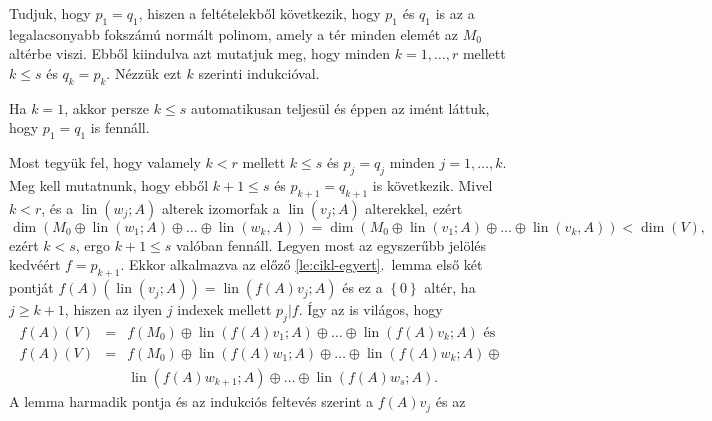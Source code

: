 \documentclass[a4paper, showtrims]{memoir}
\makeatletter
\renewenvironment{proof}[1][\proofname]
    {\par\pushQED{\qed}%
    \normalfont \topsep6\p@\@plus6\p@\relax
    \trivlist
    \item[\hskip\labelsep
        \itshape
    #1\@addpunct{:}]\ignorespaces}
    {\popQED\endtrivlist\@endpefalse}
\theoremstyle{plain}
\theoremstyle{remark}
\theoremstyle{definition}
\DeclareMathOperator{\lin}{lin}
\makeatother
\begin{document}
\begin{proof}
    Tudjuk, hogy $p_1=q_1$, hiszen a feltételekből következik, hogy $p_1$ és $q_1$ is az a legalacsonyabb fokszámú normált polinom, amely a tér minden elemét az $M_0$ altérbe viszi.
    Ebből kiindulva azt mutatjuk meg, 
    hogy minden $k=1,\ldots,r$ mellett $k\leq s$ és $q_k=p_k$.
    Nézzük ezt $k$ szerinti indukcióval.

    Ha $k=1$, akkor persze $k\leq s$ automatikusan teljesül és éppen az imént láttuk, hogy $p_1=q_1$ is fennáll.

    Most tegyük fel, hogy valamely $k<r$ mellett $k\leq s$ és $p_j=q_j$ minden $j=1,\ldots,k$.
    Meg kell mutatnunk, hogy ebből $k+1\leq s$ és $p_{k+1}=q_{k+1}$ is következik.
    Mivel $k<r$, és a $\lin\left( w_j;A \right)$ alterek izomorfak a $\lin\left( v_j;A \right)$ alterekkel,
    ezért
    \begin{displaymath}
        \dim(M_0\oplus\lin\left( w_1;A \right)
        \oplus\ldots\oplus
        \lin\left( w_k,A \right))
        =
        \dim(M_0\oplus\lin\left( v_1;A \right)
        \oplus\ldots\oplus
        \lin\left( v_k,A \right))
        <
        \dim\left( V \right),
    \end{displaymath}
    ezért $k<s$, ergo $k+1\leq s$ valóban fennáll.
    Legyen most az egyszerűbb jelölés kedvéért $f=p_{k+1}$.
    Ekkor alkalmazva az előző \ref{le:cikl-egyert}.~lemma első két pontját 
    $f\left( A \right)\left( \lin\left( v_j;A \right) \right)
    =
    \lin\left( f\left( A \right)v_j;A \right)
    $ és ez a 
    $\left\{ 0 \right\}$ 
    altér, ha $j\geq k+1$, hiszen az ilyen $j$ indexek mellett $p_j|f$.
    Így az is világos, hogy
    \begin{eqnarray*}
        f\left( A \right)(V)
        &=& 
        f\left( M_0 \right)
        \oplus
        \lin\left( f\left( A \right)v_1;A \right)
        \oplus\ldots\oplus
        \lin\left( f\left( A \right)v_k;A \right)
        \text{ és }
        \\
        f\left( A \right)(V)
        &=& 
        f\left( M_0 \right)
        \oplus
        \lin\left( f\left( A \right)w_1;A \right)
        \oplus\ldots\oplus
        \lin\left( f\left( A \right)w_k;A \right)
        \oplus
        \\
        &&
        \lin\left( f\left( A \right)w_{k+1};A \right)
        \oplus\ldots\oplus
        \lin\left( f\left( A \right)w_s;A \right).
    \end{eqnarray*}
    A lemma harmadik pontja és az indukciós feltevés szerint a $f\left( A \right)v_j$ és az

\end{proof}
\end{document}
